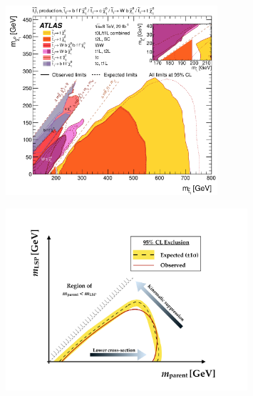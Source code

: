 \begin{figure}[!htb]
    \begin{center}
        \includegraphics[width=0.7\textwidth]{figures/search_stop2l/run1_stop_summary}
        \caption{
        }
        \label{fig:run1_stop_summary}
    \end{center}
\end{figure}


\begin{figure}[!htb]
    \begin{center}
        \includegraphics[width=0.8\textwidth]{figures/search_stop2l/susy_exclusion_cartoonPDF}
        \caption{
        }
        \label{fig:susy_exclusion_cartoon}
    \end{center}
\end{figure}


